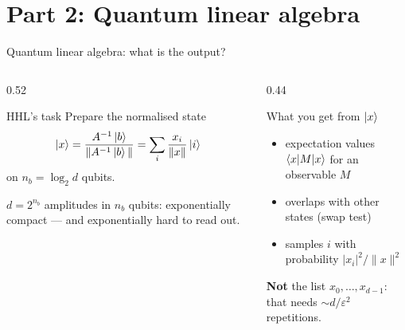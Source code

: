 \documentclass[aspectratio=169,11pt]{beamer}
\begin{document}
\section{Part 2: Quantum linear algebra}
\begin{frame}{Quantum linear algebra: what is the output?}
  \begin{columns}[T]
    \begin{column}{0.52\textwidth}
      \begin{block}{HHL's task}
        Prepare the normalised state
        \[ \ket x = \frac{A^{-1}\ket b}{\|A^{-1}\ket b\|} = \sum_i\frac{x_i}{\|x\|}\ket i \]
        on $n_b = \log_2d$ qubits.
      \end{block}
      \small $d = 2^{n_b}$ amplitudes in $n_b$ qubits: exponentially compact --- and exponentially hard to read out.
    \end{column}
    \begin{column}{0.44\textwidth}
      \begin{alertblock}{What you get from $\ket x$}
        \begin{itemize}
          \item expectation values $\braket{x|M|x}$ for an observable $M$
          \item overlaps with other states (swap test)
          \item samples $i$ with probability $|x_i|^2/\|x\|^2$
        \end{itemize}
        \textbf{Not} the list $x_0, \dots, x_{d-1}$: that needs $\sim d/\varepsilon^2$ repetitions.
      \end{alertblock}
    \end{column}
  \end{columns}
\end{frame}
\end{document}
